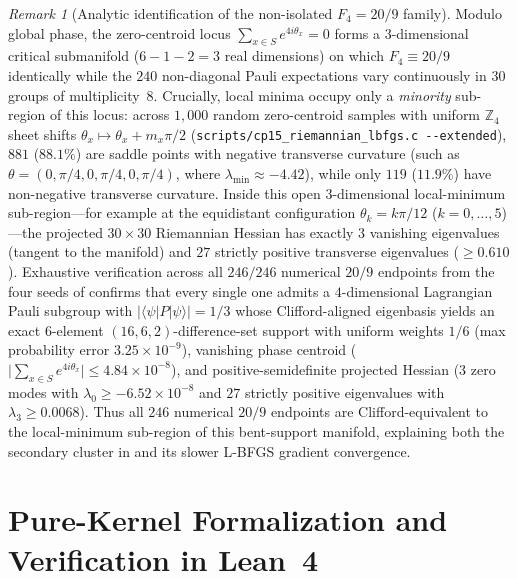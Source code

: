 \documentclass[11pt,a4paper]{article}
\theoremstyle{plain}
\theoremstyle{definition}
\theoremstyle{remark}
\newtheorem{remark}[lemma]{Remark}
\newcommand{\Z}{\mathbb{Z}}
\newcommand{\expval}[2]{\langle#1|#2|#1\rangle}
\newcommand{\abs}[1]{\lvert#1\rvert}
\numberwithin{equation}{section}
\begin{document}
\begin{remark}[Analytic identification of the non-isolated $F_4 = 20/9$ family]
Modulo global phase, the zero-centroid locus $\sum_{x \in S} e^{4i\theta_x} = 0$ forms a $3$-dimensional critical submanifold ($6 - 1 - 2 = 3$ real dimensions) on which $F_4 \equiv 20/9$ identically while the $240$ non-diagonal Pauli expectations vary continuously in $30$ groups of multiplicity~$8$. Crucially, local minima occupy only a \emph{minority} sub-region of this locus: across $1{,}000$ random zero-centroid samples with uniform $\Z_4$ sheet shifts $\theta_x \mapsto \theta_x + m_x\pi/2$ (\texttt{\small scripts/\allowbreak cp15\_\allowbreak riemannian\_\allowbreak lbfgs.c -{}-extended}), $881$ ($88.1\%$) are saddle points with negative transverse curvature (such as $\theta = (0, \pi/4, 0, \pi/4, 0, \pi/4)$, where $\lambda_{\min} \approx -4.42$), while only $119$ ($11.9\%$) have non-negative transverse curvature. Inside this open $3$-dimensional local-minimum sub-region---for example at the equidistant configuration $\theta_k = k\pi/12$ ($k = 0, \dots, 5$)---the projected $30\times 30$ Riemannian Hessian has exactly $3$ vanishing eigenvalues (tangent to the manifold) and $27$ strictly positive transverse eigenvalues ($\ge 0.610$). Exhaustive verification across all $246/246$ numerical $20/9$ endpoints from the four seeds of  confirms that every single one admits a $4$-dimensional Lagrangian Pauli subgroup with $\abs{\expval{\psi}{P}} = 1/3$ whose Clifford-aligned eigenbasis yields an exact $6$-element $(16, 6, 2)$-difference-set support with uniform weights $1/6$ (max probability error $3.25 \times 10^{-9}$), vanishing phase centroid ($\abs{\sum_{x \in S} e^{4i\theta_x}} \le 4.84 \times 10^{-8}$), and positive-semidefinite projected Hessian ($3$ zero modes with $\lambda_0 \ge -6.52 \times 10^{-8}$ and $27$ strictly positive eigenvalues with $\lambda_3 \ge 0.0068$). Thus all $246$ numerical $20/9$ endpoints are Clifford-equivalent to the local-minimum sub-region of this bent-support manifold, explaining both the secondary cluster in  and its slower L-BFGS gradient convergence.
\end{remark}

\section{Pure-Kernel Formalization and Verification in Lean~4}\label{sec:lean}
\end{document}

